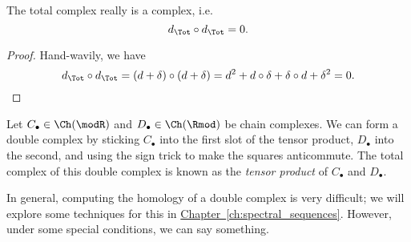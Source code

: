 \documentclass[main.tex]{subfiles}
\begin{document}
\begin{lemma}
  \label{lemma:total_complex_is_complex}
  The total complex really is a complex, i.e.
  \begin{equation*}
    d_{\Tot} \circ d_{\Tot} = 0.
  \end{equation*}
\end{lemma}
\begin{proof}
  Hand-wavily, we have
  \begin{equation*}
    d_{\Tot} \circ d_{\Tot} = (d + \delta) \circ (d + \delta) = d^{2} + d \circ \delta + \delta \circ d + \delta^{2} = 0.
  \end{equation*}
\end{proof}

\begin{example}
  Let $C_{\bullet} \in \Ch(\modR)$ and $D_{\bullet} \in \Ch(\Rmod)$ be chain complexes. We can form a double complex by sticking $C_{\bullet}$ into the first slot of the tensor product, $D_{\bullet}$ into the second, and using the sign trick to make the squares anticommute. The total complex of this double complex is known as the \emph{tensor product} of $C_{\bullet}$ and $D_{\bullet}$.
\end{example}

In general, computing the homology of a double complex is very difficult; we will explore some techniques for this in \hyperref[ch:spectral_sequences]{Chapter~\ref*{ch:spectral_sequences}}. However, under some special conditions, we can say something.
\end{document}
